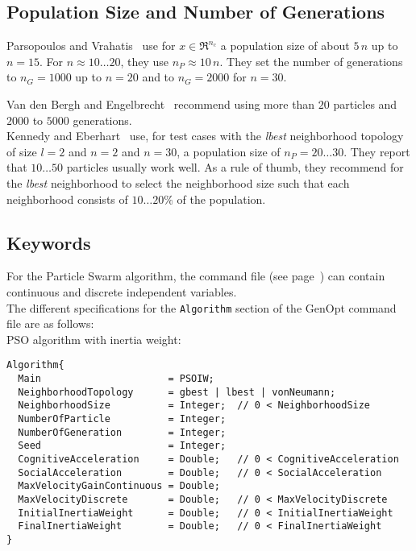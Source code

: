 \subsection{Population Size and Number of Generations}
Parsopoulos and Vrahatis~\cite{ParsopoulosVrahatis2002:1} use
for $x \in \Re^{n_c}$ a population size of about $5 \, n$ up to $n = 15$.
For $n \approx 10 \ldots 20$, they use $n_P \approx 10 \, n$.
They set the number of generations to $n_G = 1000$ up to $n = 20$ and
to $n_G = 2000$ for $n = 30$.

Van den Bergh and Engelbrecht~\cite{VanDenBerghEngelbrecht2001}
recommend using more than $20$ particles
and $2000$ to $5000$ generations.\\

Kennedy and Eberhart~\cite{KennedyEberhartShi2001} use, for
test cases with the {\it lbest} neighborhood topology of size $l=2$
and $n=2$ and $n=30$,
a population size of $n_P = 20 \ldots 30$. They report that $10 \ldots 50$
particles usually work well.
As a rule of thumb, they recommend for the {\it lbest} neighborhood to
select the neighborhood size such that each neighborhood consists of $10 \ldots 20\%$
of the population.
 
\subsection{Keywords}
For the Particle Swarm algorithm, 
the command file (see page~\pageref{par:comFil})
can contain continuous and discrete independent variables.\\

The different specifications for the \texttt{Algorithm} section 
of the GenOpt command file are as follows:\\

\noindent
PSO algorithm with inertia weight:
\begin{lstlisting}
Algorithm{
  Main                      = PSOIW;
  NeighborhoodTopology      = gbest | lbest | vonNeumann;
  NeighborhoodSize          = Integer;  // 0 < NeighborhoodSize
  NumberOfParticle          = Integer;
  NumberOfGeneration        = Integer;
  Seed                      = Integer;
  CognitiveAcceleration     = Double;   // 0 < CognitiveAcceleration
  SocialAcceleration        = Double;   // 0 < SocialAcceleration
  MaxVelocityGainContinuous = Double;
  MaxVelocityDiscrete       = Double;   // 0 < MaxVelocityDiscrete
  InitialInertiaWeight      = Double;   // 0 < InitialInertiaWeight
  FinalInertiaWeight        = Double;   // 0 < FinalInertiaWeight
}
\end{lstlisting}

